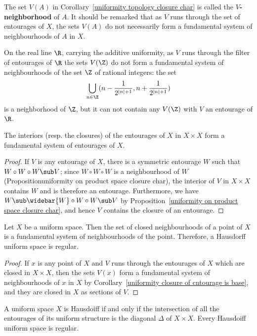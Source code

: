The set $V(A)$ in Corollary~\ref{uniformity topology closure char} is called the \textbf{$V$-neighborhood} of $A$. It should be remarked that as $V$ runs through the set of entourages of $X$, the sets $V(A)$ do not necessarily form a fundamental system of neighbourhoods of $A$ in $X$.
\begin{example}
On the real line $\R$, carrying the additive uniformity, as $V$ runs through the filter of entourages of $\R$ the sets $V(\Z)$ do not form a fundamental system of neighbourhoods of the set $\Z$ of rational integers: the set
\[\bigcup_{n\in\Z}(n-\frac{1}{2^{|n|+1}},n+\frac{1}{2^{|n|+1}})\]
is a neighborhood of $\Z$, but it can not contain any $V(\Z)$ with $V$ an  entourage of $\R$.
\end{example}
\begin{corollary}\label{uniformity closure of cntourage is base}
The interiors (resp. the closures) of the entourages of $X$ in $X\times X$ form a fundamental system of entourages of $X$.
\end{corollary}
\begin{proof}
If $V$ is any entourage of $X$, there is a symmetric entourage $W$ such that $W\circ W\circ W\sub V$; since $W\circ W\circ W$ is a neighbourhood of $W$ (Proposition{uniformity on product space closure char}), the interior of $V$ in $X\times X$ contains $W$ and is therefore an entourage. Furthermore, we have $W\sub\widebar{W}\circ W\circ W\sub V$ by Proposition~\ref{uniformity on product space closure char}, and hence $V$ contains the closure of an entourage.
\end{proof}
\begin{corollary}\label{uniform space is regular}
Let $X$ be a uniform space. Then the set of closed neighbourhoods of a point of $X$ is a fundamental system of neighbourhoods of the point. Therefore, a Hausdorff uniform space is regular.
\end{corollary}
\begin{proof}
If $x$ is any point of $X$ and $V$ runs through the entourages of $X$ which are closed in $X\times X$, then the sets $V(x)$ form a fundamental system of neighbourhoods of $x$ in $X$ by Corollary~\ref{uniformity closure of cntourage is base}, and they are closed in $X$ as sections of $V$.
\end{proof}
\begin{proposition}\label{uniform space Hausdorff iff}
A uniform space $X$ is Hausdoiff if and only if the intersection of all the entourages of its uniform structure is the diagonal $\Delta$ of $X\times X$. Every Hausdoiff uniform space is regular.
\end{proposition}
